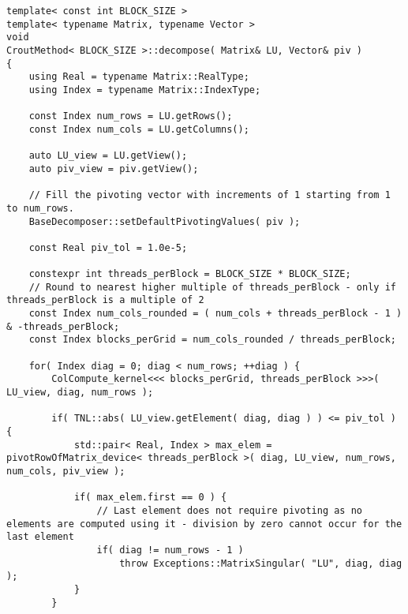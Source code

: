 \begin{lstlisting}[caption={Excerpt from the implementation of PCM\_\textit{x}PP.
The template parameter \code{BLOCK\_SIZE} is equivalent to \textit{x} in PCM\_\textit{x}PP.
On input, matrix \code{LU} is assumed to contain the values of $\mathbf{A}$, and \code{piv} is expected to be appropriately sized.
Furthermore, unlike \code{LU}, \code{piv} is assumed to be allocated on the Host.
The \code{pivotRowOfMatrix\_device()} function, presented below the \code{decompose()} method, is implemented in the parent class of \code{CroutMethod}: \code{BaseDecomposer}.
Note that the code has been slightly modified for brevity.
For example, the \code{swapRows\_device()} function has been omitted as it is a basic operation, and the checks for appropriate sizing of matrices and vectors have been removed.},label={Listing:PCMxPP-implementation-excerpt}]
template< const int BLOCK_SIZE >
template< typename Matrix, typename Vector >
void
CroutMethod< BLOCK_SIZE >::decompose( Matrix& LU, Vector& piv )
{
	using Real = typename Matrix::RealType;
	using Index = typename Matrix::IndexType;
	
	const Index num_rows = LU.getRows();
	const Index num_cols = LU.getColumns();
	
	auto LU_view = LU.getView();
	auto piv_view = piv.getView();
	
	// Fill the pivoting vector with increments of 1 starting from 1 to num_rows.
	BaseDecomposer::setDefaultPivotingValues( piv );
	
	const Real piv_tol = 1.0e-5;
	
	constexpr int threads_perBlock = BLOCK_SIZE * BLOCK_SIZE;
	// Round to nearest higher multiple of threads_perBlock - only if threads_perBlock is a multiple of 2
	const Index num_cols_rounded = ( num_cols + threads_perBlock - 1 ) & -threads_perBlock;
	const Index blocks_perGrid = num_cols_rounded / threads_perBlock;
	
	for( Index diag = 0; diag < num_rows; ++diag ) {
		ColCompute_kernel<<< blocks_perGrid, threads_perBlock >>>( LU_view, diag, num_rows );
		
		if( TNL::abs( LU_view.getElement( diag, diag ) ) <= piv_tol ) {
			std::pair< Real, Index > max_elem = pivotRowOfMatrix_device< threads_perBlock >( diag, LU_view, num_rows, num_cols, piv_view );
			
			if( max_elem.first == 0 ) {
				// Last element does not require pivoting as no elements are computed using it - division by zero cannot occur for the last element
				if( diag != num_rows - 1 )
					throw Exceptions::MatrixSingular( "LU", diag, diag );
			}
		}
		

\end{lstlisting}
